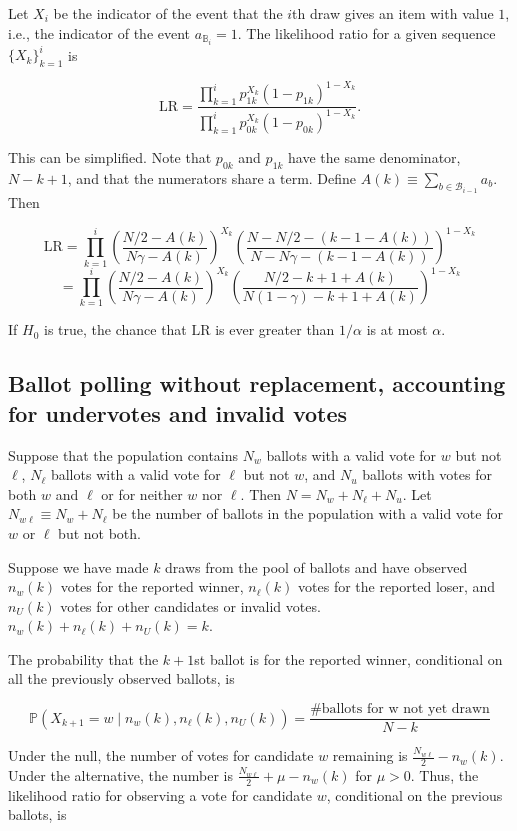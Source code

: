 \documentclass[12pt]{article}
\begin{document}
Let $X_i$ be the indicator of the event that the $i$th draw gives an item with
value $1$, i.e., the indicator of the event $a_{\mathbb B_i} = 1$.
The likelihood ratio for a given sequence $\{X_k\}_{k=1}^i$ is

$$
    \mbox{LR} = \frac{\prod_{k=1}^i p_{1k}^{X_k}(1-p_{1k})^{1-X_k}}
         {\prod_{k=1}^i p_{0k}^{X_k}(1-p_{0k})^{1-X_k}}.
$$

This can be simplified. 
Note that $p_{0k}$ and $p_{1k}$ have the same denominator,
$N - k + 1$, and that the numerators share a term.
Define $A(k) \equiv \sum_{b \in {\mathcal B_{i-1}}} a_b$.
Then

$$
    \mbox{LR} = \prod_{k=1}^i 
    \left ( \frac{N/2 - A(k)}{N\gamma - A(k)} \right )^{X_k}
    \left ( \frac{N-N/2 - (k-1-A(k))}{N-N\gamma - (k - 1 - A(k))} \right )^{1-X_k}
$$
$$
   = \prod_{k=1}^i  \left ( \frac{N/2 - A(k)}{N\gamma - A(k)} \right )^{X_k}
    \left ( \frac{N/2 - k + 1 + A(k)}{N(1-\gamma) - k + 1 + A(k)} \right )^{1-X_k}
$$

If $H_0$ is true, the chance that $\mbox{LR}$ is ever greater than $1/\alpha$
is at most $\alpha$.

\subsection{Ballot polling without replacement, accounting for undervotes and invalid votes}
Suppose that the population contains $N_w$ ballots with a valid vote for $w$ but not $\ell$,
$N_\ell$ ballots with a valid vote for $\ell$ but not $w$, and $N_u$ ballots with votes for both
$w$ and $\ell$ or for neither $w$ nor $\ell$.
Then $N = N_w + N_\ell + N_u$.
Let $N_{w\ell} \equiv N_w + N_\ell$ be the number of ballots in the 
population with a valid vote for $w$ or $\ell$ but not both.

Suppose we have made $k$ draws from the pool of ballots and have observed $n_w(k)$ votes for the reported winner, 
$n_\ell(k)$ votes for the reported loser, 
and $n_U(k)$ votes for other candidates or invalid votes.
$n_w(k)+n_\ell(k)+n_U(k) = k$.

The probability that the $k+1$st ballot is for the reported winner, conditional on all the previously observed ballots, is

$$\mathbb{P}(X_{k+1} = w \mid  n_w(k), n_\ell(k), n_U(k)) = \frac{\text{\# ballots for w not yet drawn}}{N - k}$$

Under the null, the number of votes for candidate $w$ remaining is $\frac{N_{w\ell}}{2} - n_w(k)$.  
Under the alternative, the number is $\frac{N_{w\ell}}{2} + \mu - n_w(k)$ for $\mu > 0$.
Thus, the likelihood ratio for observing a vote for candidate $w$, conditional on the previous ballots, is
\end{document}
